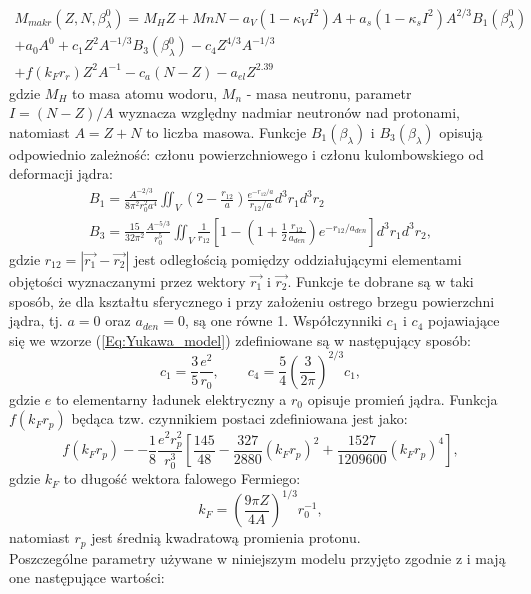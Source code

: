 \documentclass[a4paper,polish]{article}
\numberwithin{equation}{section}
\begin{document}
\begin{equation} \label{Eq:Yukawa_model}
\begin{gathered}
M_{makr}(Z,N,\beta^0_{\lambda})=M_{H}Z+M{n}N-a_{V}(1-\kappa_{V}I^2)A+a_{s}(1-\kappa_{s}I^2)A^{2/3}B_{1}(\beta^{0}_{\lambda}) \\
+a_{0}A^{0}+c_{1}Z^{2}A^{-1/3}B_{3}(\beta^{0}_{\lambda})-c_{4}Z^{4/3}A^{-1/3} \\
+f(k_{F}r_{r})Z^{2}A^{-1}-c_{a}(N-Z)-a_{el}Z^{2.39}
\end{gathered}
\end{equation}
gdzie $M_{H}$ to masa atomu wodoru, $M_{n}$ - masa neutronu, parametr $I=(N-Z)/A$ wyznacza względny nadmiar neutronów nad protonami, natomiast $A=Z+N$ to liczba masowa. Funkcje $B_{1}(\beta_{\lambda})$ i $B_{3}(\beta_{\lambda})$ opisują odpowiednio zależność: członu powierzchniowego i członu kulombowskiego od deformacji jądra:
\begin{gather}
B_{1}=\frac{A^{-2/3}}{8\pi^{2}r^{2}_{0}a^{4}}\iint_V\left(2-\frac{r_{12}}{a}\right)\frac{e^{-r_{12}/a}}{r_{12}/a}d^{3}r_{1}d^{3}r_{2} \\
B_{3}=\frac{15}{32\pi^{2}}\frac{A^{-5/3}}{r^{5}_{0}}\iint_V\frac{1}{r_{12}}\left[1-\left(1+\frac{1}{2}\frac{r_{12}}{a_{den}}\right)e^{-r_{12}/a_{den}}\right]d^{3}r_{1}d^{3}r_{2},
\end{gather}
gdzie $r_{12}=\left|\vec{r_{1}}-\vec{r_{2}}\right|$ jest odległością pomiędzy oddziałującymi elementami objętości wyznaczanymi przez wektory $\vec{r_{1}}$ i $\vec{r_{2}}$. Funkcje te dobrane są w taki sposób, że dla kształtu sferycznego i przy założeniu ostrego brzegu powierzchni jądra, tj. $a=0$ oraz $a_{den}=0$, są one równe 1. Współczynniki $c_{1}$ i $c_{4}$ pojawiające się we wzorze (\ref{Eq:Yukawa_model}) zdefiniowane są w następujący sposób:
\begin{equation}
c_{1}=\frac{3}{5}\frac{e^{2}}{r_{0}}, \qquad c_{4}=\frac{5}{4}\left(\frac{3}{2\pi}\right)^{2/3}c_{1},
\end{equation}
gdzie $e$ to elementarny ładunek elektryczny a $r_{0}$ opisuje promień jądra. Funkcja $f(k_{F}r_{p})$ będąca tzw. czynnikiem postaci zdefiniowana jest jako:
\begin{equation}
f(k_{F}r_{p})--\frac{1}{8}\frac{e^{2}r^{2}_{p}}{r^{3}_{0}}\left[\frac{145}{48}-\frac{327}{2880}(k_{F}r_{p})^{2}+\frac{1527}{1209600}(k_{F}r_{p})^{4}\right],
\end{equation}
gdzie $k_{F}$ to długość wektora falowego Fermiego:
\begin{equation}
k_{F}=\left(\frac{9\pi Z}{4A}\right)^{1/3}r^{-1}_{0},
\end{equation}
natomiast $r_{p}$ jest średnią kwadratową promienia protonu. \\
Poszczególne parametry używane w niniejszym modelu przyjęto zgodnie z \cite{Moll1,Moll2} i mają one następujące wartości:
\end{document}
